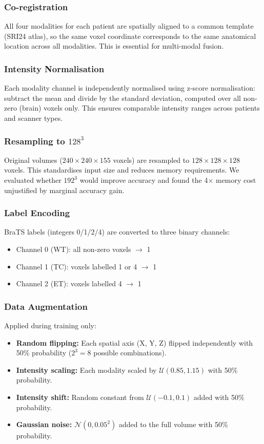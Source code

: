 \documentclass[12pt,a4paper]{article}
\begin{document}
\subsubsection{Co-registration}
All four modalities for each patient are spatially aligned to a common template (SRI24 atlas), so the same voxel coordinate corresponds to the same anatomical location across all modalities. This is essential for multi-modal fusion.

\subsubsection{Intensity Normalisation}
Each modality channel is independently normalised using z-score normalisation: subtract the mean and divide by the standard deviation, computed over all non-zero (brain) voxels only. This ensures comparable intensity ranges across patients and scanner types.

\subsubsection{Resampling to $128^3$}
Original volumes ($240 \times 240 \times 155$ voxels) are resampled to $128 \times 128 \times 128$ voxels. This standardises input size and reduces memory requirements. We evaluated whether $192^3$ would improve accuracy and found the 4$\times$ memory cost unjustified by marginal accuracy gain.

\subsubsection{Label Encoding}
BraTS labels (integers 0/1/2/4) are converted to three binary channels:
\begin{itemize}[noitemsep]
  \item Channel 0 (WT): all non-zero voxels $\rightarrow$ 1
  \item Channel 1 (TC): voxels labelled 1 or 4 $\rightarrow$ 1
  \item Channel 2 (ET): voxels labelled 4 $\rightarrow$ 1
\end{itemize}

\subsubsection{Data Augmentation}
Applied during training only:
\begin{itemize}[noitemsep]
  \item \textbf{Random flipping:} Each spatial axis (X, Y, Z) flipped independently with 50\% probability ($2^3=8$ possible combinations).
  \item \textbf{Intensity scaling:} Each modality scaled by $\mathcal{U}(0.85, 1.15)$ with 50\% probability.
  \item \textbf{Intensity shift:} Random constant from $\mathcal{U}(-0.1, 0.1)$ added with 50\% probability.
  \item \textbf{Gaussian noise:} $\mathcal{N}(0, 0.05^2)$ added to the full volume with 50\% probability.
\end{itemize}
\end{document}
